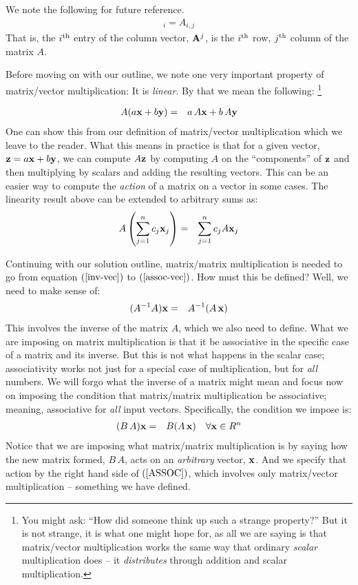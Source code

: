 \documentclass{article}
\begin{document}
We note the following for future reference.
\begin{eqnarray}
	[{\bf A}^j]_i = A_{i, j} \label{vec-matrix-index}
\end{eqnarray}
That is, the $i^{\rm th}$ entry of the column vector, ${\bf A}^j$, is the
$i^{\rm th}$ row,  $j^{\rm th}$ column of the matrix $A$. 

Before moving on with our outline, we note one very important property of 
matrix/vector multiplication: It is {\em linear\/}.
By that we mean the following:%
\footnote{You might ask: ``How did someone think up such a 
strange property?'' But it is not strange, it is what one might hope for, as all we
are saying is that matrix/vector multiplication works the same way that ordinary {\em scalar\/} 
multiplication does -- it {\em distributes\/} through addition and scalar multiplication.} 

\begin{eqnarray}
	A( a {\bf x} + b{\bf y} ) & = & a\, A{\bf x} + b\, A{\bf y}
\end{eqnarray}
One can show this from our definition of matrix/vector multiplication which we
leave to the reader. What this means in practice is that for a given vector, ${\bf z} = a{\bf x} + b{\bf y}$,
we can compute $A {\bf z}$ by computing $A$ on the ``components'' of ${\bf z}$ and then multiplying by scalars and adding
the resulting vectors.
This can be an easier way to compute the {\em action\/} of a matrix on a vector in some cases.
The linearity result above can be extended to arbitrary sums as:
\begin{eqnarray}
	A\left( \sum_{j=1}^n c_j {\bf x}_j \right) & = & \sum_{j=1}^n c_j A {\bf x}_j \label{linearity}
\end{eqnarray}

Continuing with our solution outline, matrix/matrix multiplication is needed
to go from equation $(\ref{inv-vec})$ to $(\ref{assoc-vec})$. How must this be defined?
Well, we need to make sense of:
\begin{eqnarray}
  (A^{-1} A) {\bf x} & = & A^{-1} (A \, {\bf x}) 
\end{eqnarray}
This involves the inverse of the matrix $A$, which we also need to define. 
What we are imposing on matrix multiplication is that it be associative in the
specific case of a matrix and its inverse. But this is not what happens in the scalar case;
associativity works not just for a special case of multiplication, but for {\em all\/} numbers.
We will forgo what the inverse of a matrix might mean and focus now on imposing the 
condition that matrix/matrix multiplication be associative; meaning, associative for {\em all\/} input vectors.
Specifically, the condition we impose is:
\begin{eqnarray}
	(B\, A) {\bf x} & = & B (A \, {\bf x}) \quad \forall {\bf x} \in R^n \label{ASSOC}
\end{eqnarray}
Notice that we are imposing what matrix/matrix multiplication is by saying how the 
new matrix formed, $B \, A$, acts on an {\em arbitrary\/} vector, ${\bf x}$. And we 
specify that action by the right hand side of $(\ref{ASSOC})$, which involves only matrix/vector
multiplication -- something we have defined.
\end{document}
